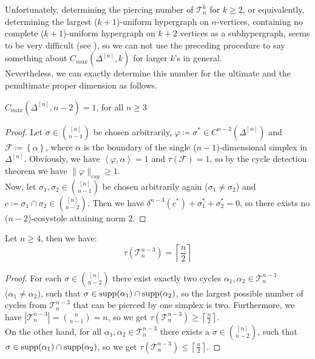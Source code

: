 Unfortunately, determining the piercing number of \(\mathcal{T}_n^k\) for \(k\geq 2\), or equivalently, determining the largest (\(k+1\))-uniform hypergraph on \(n\)-vertices, containing no complete (\(k+1\))-uniform hypergraph on \(k+2\) vertices as a subhypergraph, seems to be very difficult (see \cite{7}), so we can not use the preceding procedure to say something about \(C_{max}(\Delta^{[n]},k)\) for larger \(k\)'s in general.\\
Nevertheless, we can exactly determine this number for the ultimate and the penultimate proper dimension as follows.

\begin{thm}\label{theorem7}
\(C_{max}(\Delta^{[n]},n-2)=1\), for all \(n\geq 3\)
\begin{proof}
Let \(\sigma\in\binom{[n]}{n-1}\) be chosen arbitrarily, \(\varphi\coloneqq \sigma^*\in C^{n-2}(\Delta^{[n]})\) and\\
\(\mathcal{F}\coloneqq \left\{\alpha\right\}\), where \(\alpha\) is the boundary of the single (\(n-1\))-dimensional simplex in \(\Delta^{[n]}\). Obviously, we have \(\left\langle\varphi,\alpha\right\rangle=1\) and \(\tau(\mathcal{F})=1\), so by the cycle detection theorem we have \(\|\varphi\|_{csy}\geq 1\).\\
Now, let \(\sigma_1,\sigma_2\in\binom{[n]}{n-1}\) be chosen arbitrarily again (\(\sigma_1\neq\sigma_2\)) and \(c\coloneqq \sigma_1\cap\sigma_2\in\binom{[n]}{n-2}\). Then we have \(\delta^{n-3}(c^*)+\sigma_1^*+\sigma_2^*=0\), so there exists no (\(n-2\))-cosystole attaining norm \(2\).
\end{proof}
\end{thm}

\begin{lem}\label{lemma12}
Let \(n\geq 4\), then we have:
\[
\tau(\mathcal{T}_n^{n-3})=\left\lceil\frac{n}{2}\right\rceil
\]
\begin{proof}
For each \(\sigma\in\binom{[n]}{n-2}\) there exist exactly two cycles \(\alpha_1,\alpha_2\in\mathcal{T}_n^{n-3}\)\\
(\(\alpha_1\neq\alpha_2\)), such that \(\sigma\in \mathrm{supp}(\alpha_1)\cap \mathrm{supp}(\alpha_2)\), so the largest possible number of cycles from \(\mathcal{T}_n^{n-3}\) that can be pierced by one simplex is two. Furthermore, we have \(\left|\mathcal{T}_n^{n-3}\right|=\binom{n}{n-1}=n\), so we get \(\tau(\mathcal{T}_n^{n-3})\geq\left\lceil\frac{n}{2}\right\rceil\).\\
On the other hand, for all \(\alpha_1,\alpha_2\in\mathcal{T}_n^{n-3}\) there exists a \(\sigma\in\binom{[n]}{n-2}\), such that\\
\(\sigma\in \mathrm{supp}(\alpha_1)\cap \mathrm{supp}(\alpha_2)\), so we get \(\tau(\mathcal{T}_n^{n-3})\leq\left\lceil\frac{n}{2}\right\rceil\).
\end{proof}
\end{lem}

